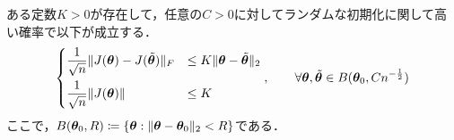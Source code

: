 \begin{lem}[Jacobianの局所リプシッツ性]
    \label{jacob_local_lipschitz}
    ある定数$K>0$が存在して，任意の$C>0$に対してランダムな初期化に関して高い確率で以下が成立する．
    \begin{align}
        \begin{dcases}
            \dfrac{1}{\sqrt{n}}\|J(\bm{\theta}) - J(\tilde{\bm{\theta}})\|_F &\leq K\|\bm{\theta} - \tilde{\bm{\theta}}\|_2 \\
            \dfrac{1}{\sqrt{n}}\|J(\bm{\theta})\| &\leq K
        \end{dcases}
        , \qquad \forall\bm{\theta}, \tilde{\bm{\theta}} \in B(\bm{\theta}_0, Cn^{-\frac{1}{2}})
    \end{align}
    ここで，$B(\bm{\theta}_0, R) \coloneqq \left\{\bm{\theta}:\|\bm{\theta} - \bm{\theta}_0\|_2 < R\right\}$である．
\end{lem}
